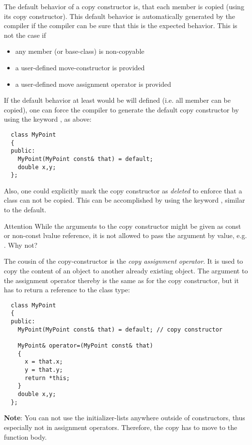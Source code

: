 The default behavior of a copy constructor is, that each member is copied (using its copy constructor). This default behavior is automatically generated
by the compiler if the compiler can be sure that this is the expected behavior. This is not the case if
\begin{itemize}
  \item any member (or base-class) is non-copyable
  \item a user-defined move-constructor is provided
  \item a user-defined move assignment operator is provided
\end{itemize}

If the default behavior at least would be will defined (i.e. all member can be copied), one can force the compiler to generate the default copy constructor
by using the keyword , as above:
%
\begin{verbatim}
  class MyPoint
  {
  public:
    MyPoint(MyPoint const& that) = default;
    double x,y;
  };
\end{verbatim}

Also, one could explicitly mark the copy constructor as \emph{deleted} to enforce that a class can not be copied. This can be accomplished by using the
keyword , similar to the default.

\begin{guideline}{Attention}
  While the arguments to the copy constructor might be given as const or non-const lvalue reference, it is not allowed to pass the argument by value, e.g.
  . Why not?
\end{guideline}

The cousin of the copy-constructor is the \emph{copy assignment operator}. It is used to copy the content of an object to another already existing object.
The argument to the assignment operator thereby is the same as for the copy constructor, but it has to return a reference to the class type:
%
\begin{verbatim}
  class MyPoint
  {
  public:
    MyPoint(MyPoint const& that) = default; // copy constructor

    MyPoint& operator=(MyPoint const& that)
    {
      x = that.x;
      y = that.y;
      return *this;
    }
    double x,y;
  };
\end{verbatim}

\textbf{Note}: You can not use the initializer-lists anywhere outside of constructors, thus especially not in assignment operators. Therefore, the copy has to
move to the function body.

